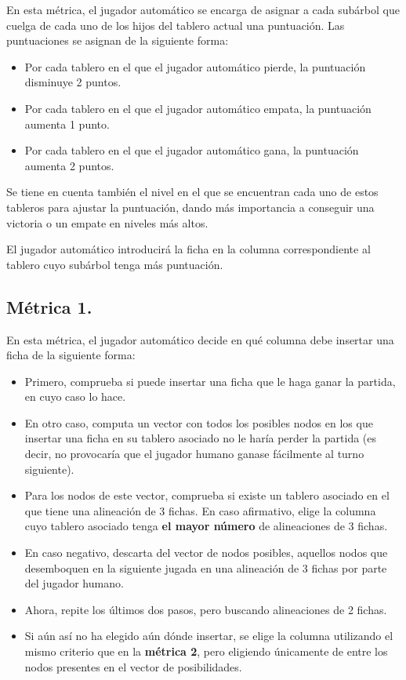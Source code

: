 \documentclass[11pt]{article}
\begin{document}
En esta métrica, el jugador automático se encarga de asignar a cada subárbol que cuelga de cada uno de los hijos del tablero actual una puntuación. Las puntuaciones se asignan de la siguiente forma:

\begin{itemize}
\item Por cada tablero en el que el jugador automático pierde, la puntuación disminuye 2 puntos.
\item Por cada tablero en el que el jugador automático empata, la puntuación aumenta 1 punto.
\item Por cada tablero en el que el jugador automático gana, la puntuación aumenta 2 puntos.
\end{itemize}

Se tiene en cuenta también el nivel en el que se encuentran cada uno de estos tableros para ajustar la puntuación, dando más importancia a conseguir una victoria o un empate en niveles más altos.

El jugador automático introducirá la ficha en la columna correspondiente al tablero cuyo subárbol tenga más puntuación.

\subsection{Métrica 1.}
\label{sec-2-4}

En esta métrica, el jugador automático decide en qué columna debe insertar una ficha de la siguiente forma:

\begin{itemize}
\item Primero, comprueba si puede insertar una ficha que le haga ganar la partida, en cuyo caso lo hace.
\item En otro caso, computa un vector con todos los posibles nodos en los que insertar una ficha en su tablero asociado no le haría perder la partida (es decir, no provocaría que el jugador humano ganase fácilmente al turno siguiente).
\item Para los nodos de este vector, comprueba si existe un tablero asociado en el que tiene una alineación de 3 fichas. En caso afirmativo, elige la columna cuyo tablero asociado tenga \textbf{\textbf{el mayor número}} de alineaciones de 3 fichas.
\item En caso negativo, descarta del vector de nodos posibles, aquellos nodos que desemboquen en la siguiente jugada en una alineación de 3 fichas por parte del jugador humano.
\item Ahora, repite los últimos dos pasos, pero buscando alineaciones de 2 fichas.
\item Si aún así no ha elegido aún dónde insertar, se elige la columna utilizando el mismo criterio que en la \textbf{\textbf{métrica 2}}, pero eligiendo únicamente de entre los nodos presentes en el vector de posibilidades.
\end{itemize}
\end{document}
